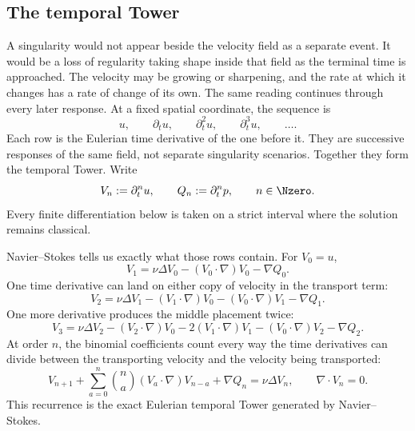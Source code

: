 \subsection{The temporal Tower}\label{sub:BodyFiniteTimeResponseEscalation}

A singularity would not appear beside the velocity field as a separate event.
It would be a loss of regularity taking shape inside that field as the terminal time is approached.
The velocity may be growing or sharpening, and the rate at which it changes has a rate of change of its own.
The same reading continues through every later response.
At a fixed spatial coordinate, the sequence is
\[
  u,
  \qquad
  \partial_tu,
  \qquad
  \partial_t^2u,
  \qquad
  \partial_t^3u,
  \qquad
  \ldots .
\]
Each row is the Eulerian time derivative of the one before it.
They are successive responses of the same field, not separate singularity scenarios.
Together they form the temporal Tower.
Write
\begin{equation}\label{eq:TemporalTowerDefinitionBody}
  V_n:=\partial_t^nu,
  \qquad
  Q_n:=\partial_t^np,
  \qquad
  n\in\Nzero.
\end{equation}
Every finite differentiation below is taken on a strict interval where the solution remains classical.

Navier--Stokes tells us exactly what those rows contain.
For \(V_0=u\),
\[
  V_1
  =\nu\Delta V_0
  -(V_0\cdot\nabla)V_0
  -\nabla Q_0.
\]
One time derivative can land on either copy of velocity in the transport term:
\[
  V_2
  =\nu\Delta V_1
  -(V_1\cdot\nabla)V_0
  -(V_0\cdot\nabla)V_1
  -\nabla Q_1.
\]
One more derivative produces the middle placement twice:
\[
  V_3
  =\nu\Delta V_2
  -(V_2\cdot\nabla)V_0
  -2(V_1\cdot\nabla)V_1
  -(V_0\cdot\nabla)V_2
  -\nabla Q_2.
\]
At order \(n\), the binomial coefficients count every way the time derivatives can divide between the transporting velocity and the velocity being transported:
\begin{equation}\label{eq:BodyTemporalVelocityRecurrence}
  V_{n+1}
  +\sum_{a=0}^{n}\binom{n}{a}(V_a\cdot\nabla)V_{n-a}
  +\nabla Q_n
  =\nu\Delta V_n,
  \qquad
  \nabla\cdot V_n=0.
\end{equation}
This recurrence is the exact Eulerian temporal Tower generated by Navier--Stokes.

